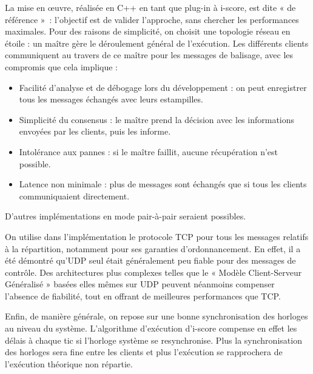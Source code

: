 \documentclass[10pt]{article}
\begin{document}
La mise en œuvre, réalisée en C++ en tant que plug-in à i-score, est dite « de référence »~: l'objectif est de valider l'approche, sans chercher les performances maximales.
Pour des raisons de simplicité, on choisit une topologie réseau en étoile : un maître gère le déroulement général de l'exécution. 
Les différents clients communiquent au travers de ce maître pour les messages de balisage, avec les compromis que cela implique : 
\begin{itemize}
    \item Facilité d'analyse et de débogage lors du développement : on peut enregistrer tous les messages échangés avec leurs estampilles.
    \item Simplicité du consensus : le maître prend la décision avec les informations envoyées par les clients, puis les informe.
    \item Intolérance aux pannes : si le maître faillit, aucune récupération n'est possible.
    \item Latence non minimale : plus de messages sont échangés que si tous les clients communiquaient directement.
\end{itemize}

D'autres implémentations en mode pair-à-pair seraient possibles. 

On utilise dans l'implémentation le protocole TCP pour tous les messages relatifs à la répartition, notamment pour ses garanties d'ordonnancement.
En effet, il a été démontré qu'UDP seul était généralement peu fiable pour des messages de contrôle. 
Des architectures plus complexes telles que le « Modèle Client-Serveur Généralisé » basées elles mêmes sur UDP peuvent néanmoins compenser l'absence de fiabilité\cite{mckinney2012oscthulhu}, tout en offrant de meilleures performances que TCP.

Enfin, de manière générale, on repose sur une bonne synchronisation des horloges au niveau du système.
L'algorithme d'exécution d'i-score compense en effet les délais à chaque tic si l'horloge système se resynchronise.
Plus la synchronisation des horloges sera fine entre les clients et plus l'exécution se rapprochera de l'exécution théorique non répartie.



\end{document}

